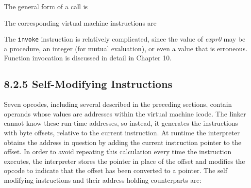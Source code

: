 
The general form of a call is

The corresponding virtual machine instructions are

\goodbreak
{}

The \texttt{invoke} instruction is relatively complicated, since the
value of \textit{expr0 }may be a procedure, an integer (for mutual
evaluation), or even a value that is erroneous. Function invocation is
discussed in detail in Chapter 10.

\subsection[8.2.5 Self-Modifying Instructions]{8.2.5 Self-Modifying Instructions}

Seven opcodes, including several described in the preceding
sections, contain operands whose values are addresses within the
virtual machine icode. The linker cannot know these run-time
addresses, so instead, it generates the instructions with byte
offsets, relative to the current instruction.  At runtime the
interpreter obtains the address in question by adding the current
instruction pointer to the offset.  In order to avoid repeating this
calculation every time the instruction executes, the interpreter
stores the pointer in place of the offset and modifies the opcode to
indicate that the offset has been converted to a pointer.  The self
modifying instructions and their address-holding counterparts are:


